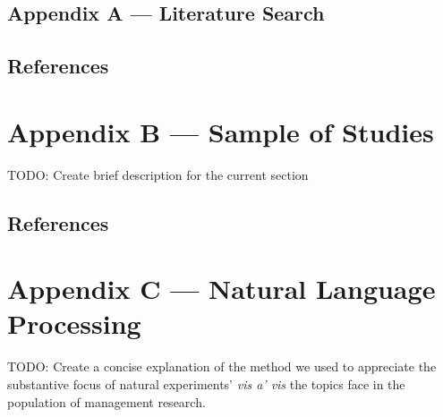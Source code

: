 \documentclass[nobib]{tufte-handout}
\newcommand{\todo}[1]{}
\renewcommand{\todo}[1]{{\color{RedOrange} TODO: {#1}}}
\begin{document}
\begin{refsection}

\section{Appendix A --- Literature Search}
\label{sec:sampling}

\setcounter{table}{0}
\renewcommand{\thetable}{A\arabic{table}}
\renewcommand{\thefigure}{A\arabic{figure}}



\subsection{References}

\printbibliography[heading=none]

\end{refsection}

\section{Appendix B --- Sample of Studies}
\label{sec:sample_of_studies}

\todo{Create brief description for the current section}

\begin{refsection}

  \setcounter{table}{0}
\renewcommand{\thetable}{B\arabic{table}}
\renewcommand{\thefigure}{B\arabic{figure}}



\subsection{References}

\printbibliography[heading=none]

\end{refsection}

\section{Appendix C --- Natural Language Processing}
\label{sec:nlp}

\todo{Create a concise explanation of the method we used to appreciate the 
substantive focus of natural experiments' \textit{vis a' vis} the topics
face in the population of management research.}
\end{document}

